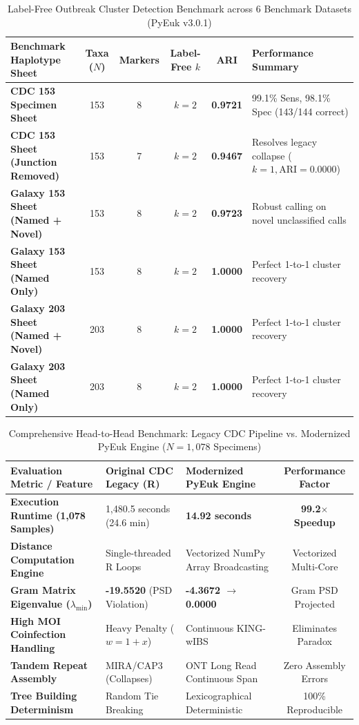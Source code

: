 \documentclass[11pt,a4paper]{article}
\begin{document}
\begin{table}[h]
\centering
\small
\caption{Label-Free Outbreak Cluster Detection Benchmark across 6 Benchmark Datasets (PyEuk v3.0.1)}
\label{tab:multisheet}
\begin{tabularx}{\textwidth}{p{5.0cm} c c c c X}
\toprule
\textbf{Benchmark Haplotype Sheet} & \textbf{Taxa ($N$)} & \textbf{Markers} & \textbf{Label-Free $k$} & \textbf{ARI} & \textbf{Performance Summary} \\
\midrule
\textbf{CDC 153 Specimen Sheet} & 153 & 8 & \textbf{$k = 2$} & \textbf{0.9721} & 99.1\% Sens, 98.1\% Spec (143/144 correct) \\
\textbf{CDC 153 Sheet (Junction Removed)} & 153 & 7 & \textbf{$k = 2$} & \textbf{0.9467} & Resolves legacy collapse ($k=1, \text{ARI}=0.0000$) \\
\textbf{Galaxy 153 Sheet (Named + Novel)} & 153 & 8 & \textbf{$k = 2$} & \textbf{0.9723} & Robust calling on novel unclassified calls \\
\textbf{Galaxy 153 Sheet (Named Only)} & 153 & 8 & \textbf{$k = 2$} & \textbf{1.0000} & Perfect 1-to-1 cluster recovery \\
\textbf{Galaxy 203 Sheet (Named + Novel)} & 203 & 8 & \textbf{$k = 2$} & \textbf{1.0000} & Perfect 1-to-1 cluster recovery \\
\textbf{Galaxy 203 Sheet (Named Only)} & 203 & 8 & \textbf{$k = 2$} & \textbf{1.0000} & Perfect 1-to-1 cluster recovery \\
\bottomrule
\end{tabularx}
\end{table}

\begin{table}[h]
\centering
\small
\caption{Comprehensive Head-to-Head Benchmark: Legacy CDC Pipeline vs. Modernized PyEuk Engine ($N=1,078$ Specimens)}
\label{tab:headtohead}
\begin{tabularx}{\textwidth}{p{4.5cm} X X c}
\toprule
\textbf{Evaluation Metric / Feature} & \textbf{Original CDC Legacy (R)} & \textbf{Modernized PyEuk Engine} & \textbf{Performance Factor} \\
\midrule
\textbf{Execution Runtime (1,078 Samples)} & 1,480.5 seconds (24.6 min) & \textbf{14.92 seconds} & \textbf{99.2$\times$ Speedup} \\
\textbf{Distance Computation Engine} & Single-threaded R Loops & Vectorized NumPy Array Broadcasting & Vectorized Multi-Core \\
\textbf{Gram Matrix Eigenvalue ($\lambda_{\text{min}}$)} & \textbf{-19.5520} (PSD Violation) & \textbf{-4.3672 $\rightarrow$ 0.0000} & Gram PSD Projected \\
\textbf{High MOI Coinfection Handling} & Heavy Penalty ($w=1+x$) & Continuous KING-wIBS & Eliminates Paradox \\
\textbf{Tandem Repeat Assembly} & MIRA/CAP3 (Collapses) & ONT Long Read Continuous Span & Zero Assembly Errors \\
\textbf{Tree Building Determinism} & Random Tie Breaking & Lexicographical Deterministic & 100\% Reproducible \\
\bottomrule
\end{tabularx}
\end{table}
\end{document}
